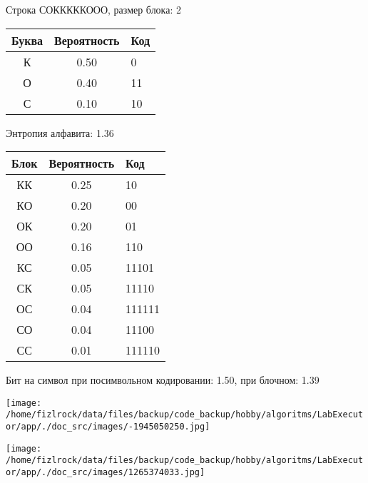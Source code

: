 \documentclass[a4paper, 12pt]{article}
\begin{document}
Строка СОКККККООО, размер блока: 2
\begin{center}
 \begin{tabular}{ |c|c|l| } 
  \hline
     Буква & Вероятность & Код\\ \hline
К & 0.50 & 0\\\hline
О & 0.40 & 11\\\hline
С & 0.10 & 10
\\ \hline \end{tabular}
\end{center}
Энтропия алфавита: 1.36
\begin{center}
 \begin{tabular}{ |c|c|l| } 
  \hline
     Блок & Вероятность & Код\\ \hline
КК & 0.25 & 10\\\hline
КО & 0.20 & 00\\\hline
ОК & 0.20 & 01\\\hline
ОО & 0.16 & 110\\\hline
КС & 0.05 & 11101\\\hline
СК & 0.05 & 11110\\\hline
ОС & 0.04 & 111111\\\hline
СО & 0.04 & 11100\\\hline
СС & 0.01 & 111110
\\ \hline \end{tabular}
\end{center}
Бит на символ при посимвольном кодировании: 1.50, при блочном: 1.39

\texttt{[image: /home/fizlrock/data/files/backup/code\_backup/hobby/algoritms/LabExecutor/app/./doc\_src/images/-1945050250.jpg]}

\texttt{[image: /home/fizlrock/data/files/backup/code\_backup/hobby/algoritms/LabExecutor/app/./doc\_src/images/1265374033.jpg]}
\end{document}
